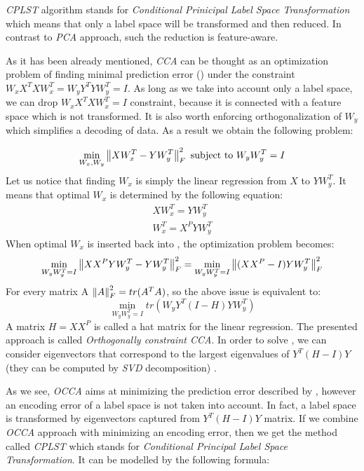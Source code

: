 \textit{CPLST} algorithm stands for \textit{Conditional Prinicipal Label Space Transformation} which means that only a label space will be transformed and then reduced. In contrast to \textit{PCA} approach, such the reduction is feature-aware. 

As it has been already mentioned, \textit{CCA} can be thought as an optimization problem of finding minimal prediction error () under the constraint $W_xX^TXW_x^T=W_yY^TYW_y^T=I$. As long as we take into account only a label space, we can drop $W_xX^TXW_x^T=I$ constraint, because it is connected with a feature space which is not transformed. It is also worth enforcing orthogonalization of $W_y$  which simplifies a decoding of data. As a result we obtain the following problem:

\begin{equation}\label{eq:cplst1}
    \min_{W_x, W_y} \left\lVert XW_x^T-YW_y^T\right\rVert_{F}^2  
    \text{  subject to   } W_yW_y^T=I   
\end{equation}
Let us notice that finding $W_x$ is simply the linear regression from $X$ to $YW_y^T$. It means that optimal $W_x$ is determined by the following equation:
\begin{equation}\label{eq:cplst2}
\begin{split}
    XW_x^T=YW_y^T \\
    W_x^T=X^PYW_y^T
\end{split}
\end{equation}
When optimal $W_x$ is inserted back into , the optimization problem becomes:
\begin{equation}\label{eq:cplst3}
    \min_{W_yW_y^T=I} \left\lVert XX^PYW_y^T-YW_y^T\right\rVert_{F}^2=\min_{W_yW_y^T=I} \left\lVert(XX^P-I)YW_y^T\right\rVert_{F}^2
\end{equation}
For every matrix A $\left\lVert A\right\rVert_{F}^2=tr(A^TA)$, so the above issue is equivalent to:
\begin{equation}\label{eq:cplst4}
    \min_{W_yW_y^T=I} tr(W_yY^T(I-H)YW_y^T)
\end{equation}
A matrix $H=XX^P$ is called a hat matrix for the linear regression. The presented approach is called \textit{Orthogonally constraint CCA}. In order to solve , we can consider eigenvectors that correspond to the largest eigenvalues of $Y^T(H-I)Y$ (they can be computed by \textit{SVD} decomposition) \cite{ChenLin}.

As we see, \textit{OCCA} aims at minimizing the prediction error described by , however an encoding error of a label space is not taken into account. In fact, a label space is transformed by eigenvectors captured from $Y^T(H-I)Y$ matrix. If we combine \textit{OCCA} approach with minimizing an encoding error, then we get the method called \textit{CPLST} which stands for \textit{Conditional Principal Label Space Transformation}. It can be modelled by the following formula:

